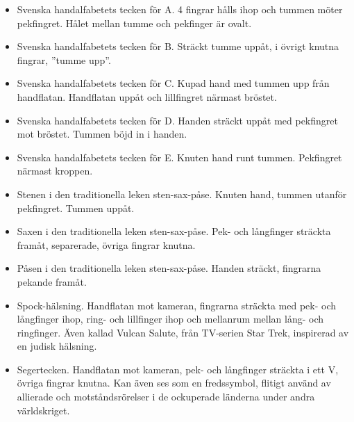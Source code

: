 \documentclass[../rapport_MVEX01-11-05]{subfiles}
\begin{document}
\begin{itemize}
 	\item Svenska handalfabetets tecken för A. 4 fingrar hålls ihop och tummen
  möter pekfingret. Hålet mellan tumme och pekfinger är ovalt.

  \item Svenska handalfabetets tecken för B. Sträckt tumme uppåt, i övrigt knutna fingrar, ''tumme upp''.

  \item Svenska handalfabetets tecken för C. Kupad hand med tummen upp från handflatan. Handflatan uppåt
  och lillfingret närmast bröstet. 

  \item Svenska handalfabetets tecken för D. Handen sträckt uppåt med pekfingret mot bröstet. Tummen böjd
  in i handen.

  \item Svenska handalfabetets tecken för E. Knuten hand runt tummen. Pekfingret närmast kroppen. 

  \item Stenen i den traditionella leken sten-sax-påse. Knuten hand, tummen utanför pekfingret. Tummen uppåt.

  \item Saxen i den traditionella leken sten-sax-påse. Pek- och långfinger sträckta framåt, separerade, övriga
  fingrar knutna.

  \item Påsen i den traditionella leken sten-sax-påse. Handen sträckt, fingrarna pekande framåt.

  \item Spock-hälsning. Handflatan mot kameran, fingrarna sträckta med pek- och
  långfinger ihop, ring- och lillfinger ihop och mellanrum mellan
  lång- och ringfinger. Även kallad Vulcan Salute, från TV-serien Star
  Trek, inspirerad av en judisk hälsning.

  \item Segertecken. Handflatan mot kameran, pek- och långfinger sträckta i
  ett V, övriga fingrar knutna. Kan även ses som en fredssymbol,
  flitigt använd av allierade och motståndsrörelser i de ockuperade
  länderna under andra världskriget.
\end{itemize}
\end{document}
